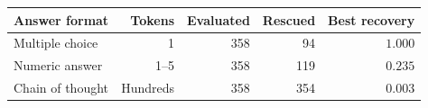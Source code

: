 \begin{tabular}{@{}lrrrr@{}}
\toprule
\rowcolor{TableHeader}
Answer format & Tokens & Evaluated & Rescued & Best recovery \\
\midrule
Multiple choice & 1 & 358 & 94 & $1.000$ \\
Numeric answer & 1--5 & 358 & 119 & $0.235$ \\
Chain of thought & Hundreds & 358 & 354 & $0.003$ \\
\bottomrule
\end{tabular}

